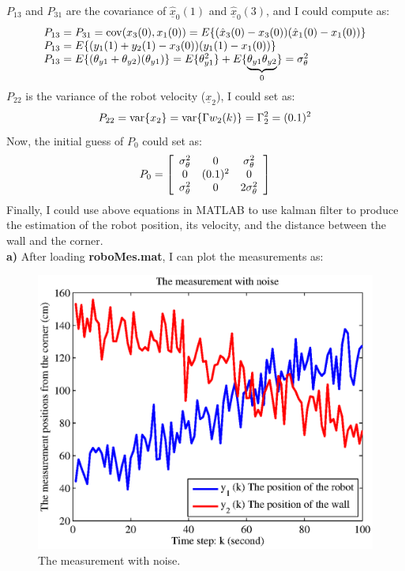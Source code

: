 \documentclass{article}
\begin{document}
$P_{13}$ and $P_{31}$ are the covariance of $\hat{\underline{x}}_0 (1)$ and $\hat{\underline{x}}_0 (3)$, and I could compute as:
\begin{eqnarray}
	\begin{array}{l}
		P_{13}  = P_{31}  = {\mathop{\rm cov}} (x_3 (0),x_1 (0)) = E\{ (\hat x_3 (0) - x_3 (0))(\hat x_1 (0) - x_1 (0))\}  \\ 
	 	P_{13}  = E\{ (y_1 (1) + y_2 (1) - x_3 (0))(y_1 (1) - x_1 (0))\}  \\ 
	 	P_{13}  = E\{ (\theta _{y1}  + \theta _{y2} )(\theta _{y1} )\}  = E\{ \theta _{y1}^2 \}  + E\{ \underbrace {\theta _{y1} \theta _{y2} }_0\}  = \sigma _\theta ^2  \\ 
	 \end{array}
\end{eqnarray}
$P_{22}$ is the variance of the robot velocity ($\underline{x}_2$), I could set as:
\begin{equation}
	P_{22}  = {\mathop{\rm var}} \{ x_2 \}  = {\mathop{\rm var}} \{ \Gamma w_2 (k)\}  = \Gamma _2^2  = (0.1)^2 
\end{equation}
Now, the initial guess of $P_0$ could set as:
\begin{equation}
P_0  = \left[ {\begin{array}{*{20}c}
   {\sigma _\theta ^2 } & 0 & {\sigma _\theta ^2 }  \\
   0 & {(0.1)^2 } & 0  \\
   {\sigma _\theta ^2 } & 0 & {2\sigma _\theta ^2 }  \\
\end{array}} \right]
\end{equation}
Finally, I could use above equations in MATLAB to use kalman filter to produce the estimation of the robot position, its velocity, and the distance between the wall and the corner.\\
\textbf{a)} After loading \textbf{roboMes.mat}, I can plot the measurements as:
\begin{figure}[H]
\begin{center}
\includegraphics[scale=0.6]{hw5_y12.eps}
\caption{The measurement with noise.}
\end{center}
\end{figure}
\end{document}
